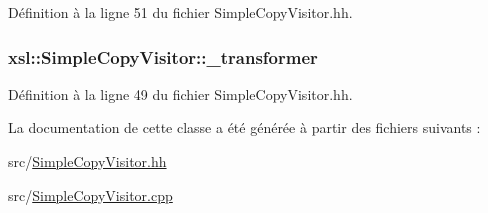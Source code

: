Définition à la ligne 51 du fichier SimpleCopyVisitor.hh.

\hypertarget{classxsl_1_1_simple_copy_visitor_a43aa3841e33993efd71980af58a09eb8}{
\subsubsection[{\_\-transformer}]{ {\bf xsl::SimpleCopyVisitor::\_\-transformer}}}
\label{classxsl_1_1_simple_copy_visitor_a43aa3841e33993efd71980af58a09eb8}


Définition à la ligne 49 du fichier SimpleCopyVisitor.hh.



La documentation de cette classe a été générée à partir des fichiers suivants :\begin{DoxyCompactItemize}
\item 
src/\hyperlink{_simple_copy_visitor_8hh}{SimpleCopyVisitor.hh}\item 
src/\hyperlink{_simple_copy_visitor_8cpp}{SimpleCopyVisitor.cpp}\end{DoxyCompactItemize}
